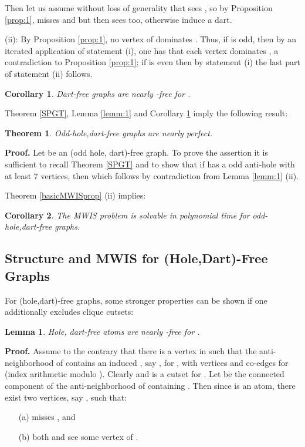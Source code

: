 \documentclass[11pt]{article}
\newcommand{\qed}{\hfill }
\newcommand{\0}{\text{ has a co-join to }}
\newcommand{\1}{\text{ has a join to }}
\newtheorem{theo}{Theorem}
\newtheorem{lemm}{Lemma}
\newtheorem{coro}{Corollary}
\begin{document}
Then let us assume without loss of generality that  sees , so by Proposition \ref{prop:1},  misses  and  but then  sees  too, otherwise  induce a dart.

\medskip

\noindent
(ii): By Proposition \ref{prop:1}, no vertex of  dominates . Thus, if  is odd, then by an iterated application of statement (i), one has that each vertex  dominates , a contradiction to Proposition \ref{prop:1}; if  is even then by statement (i) the last part of statement (ii) follows.      
\qed

\medskip

\begin{coro}\label{dartfreenearlycoC7free}
Dart-free graphs are nearly -free for .
\end{coro}

Theorem \ref{SPGT}, Lemma \ref{lemm:1} and Corollary \ref{dartfreenearlycoC7free} imply the following result:

\begin{theo}
Odd-hole,dart-free graphs are nearly perfect.
\end{theo}

\noindent
{\bf Proof.} Let  be an (odd hole, dart)-free graph. To prove the assertion it is sufficient to recall Theorem \ref{SPGT} and to 
show that if  has a odd anti-hole  with at least 7 vertices, then  which follows by contradiction from Lemma \ref{lemm:1} (ii).  
\qed

\medskip

Theorem \ref{basicMWISprop} (ii) implies:

\begin{coro}
The MWIS problem is solvable in polynomial time for odd-hole,dart-free graphs.
\end{coro}

\subsection{Structure and MWIS for (Hole,Dart)-Free Graphs}

For (hole,dart)-free graphs, some stronger properties can be shown if one additionally excludes clique cutsets: 

\begin{lemm}\label{lemm:co-c7}
Hole, dart-free atoms are nearly -free for .
\end{lemm}

\noindent
{\bf Proof.} Assume to the contrary that there is a vertex  in  such that the anti-neighborhood  of  contains an induced , say , for , with vertices  and co-edges  for  (index arithmetic modulo ). Clearly  and  is a cutset for . Let  be the connected component of the anti-neighborhood  of  containing . Then since  is an atom, there exist two vertices, say , such that: 
\begin{itemize}
\item[(a)]  misses , and 
\item[(b)] both  and  see some vertex of . 
\end{itemize}
\end{document}
